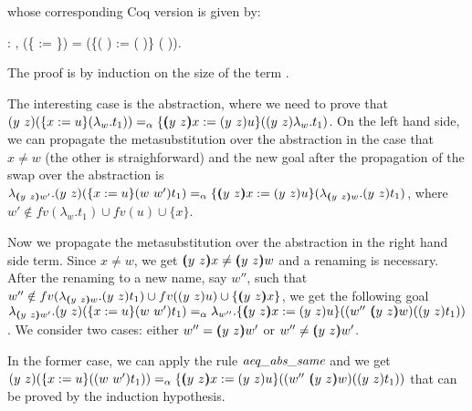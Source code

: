 \noindent whose corresponding Coq version is given by: \newline 
\begin{coqdoccode}
\coqdocnoindent
{} : \coqdockw{\ensuremath{\forall}}     ,    (\{ := \}) = (\{(   ) := (   )\} (   )).\coqdoceol
\end{coqdoccode}
 The proof is by induction on the size of the term .
\begin{coqdoccode}
\end{coqdoccode}
The interesting case is the abstraction, where we need to prove that $\swap{y}{z}{(\metasub{(\lambda_w.t_1)}{x}{u})} =_\alpha \metasub{(\swap{y}{z}{\lambda_w.t_1})}{\vswap{y}{z}{x}}{\swap{y}{z}{u}}$. On the left hand side, we can propagate the metasubstitution over the abstraction in the case that $x \neq w$ (the other is straighforward) and the new goal after the propagation of the swap over the abstraction is $\lambda_{\vswap{y}{z}{w'}}.\swap{y}{z}{(\metasub{\swap{w}{w'}{t_1}}{x}{u})} =_\alpha \metasub{(\lambda_{\vswap{y}{z}{w}}.\swap{y}{z}{t_1})}{\vswap{y}{z}{x}}{\swap{y}{z}{u}}$, where $w' \notin fv(\lambda_w.t_1) \cup fv(u) \cup \{x\}$.
\begin{coqdoccode}
\end{coqdoccode}
Now we propagate the metasubstitution over the abstraction in the right hand side term. Since $x\neq w$, we get $\vswap{y}{z}{x} \neq \vswap{y}{z}{w}$ and a renaming is necessary. After the renaming to a new name, say $w''$, such that $w'' \notin fv(\lambda_{\vswap{y}{z}{w}}.\swap{y}{z}{t_1}) \cup fv(\swap{y}{z}{u}) \cup \{\vswap{y}{z}{x}\}$, we get the following goal $\lambda_{\vswap{y}{z}{w'}}.\swap{y}{z}{(\metasub{\swap{w}{w'}{t_1}}{x}{u})} =_\alpha \lambda_{w''}.\metasub{(\swap{w''}{\vswap{y}{z}{w}}{(\swap{y}{z}{t_1})})}{\vswap{y}{z}{x}}{\swap{y}{z}{u}}$. We consider two cases: either $w'' = \vswap{y}{z}{w'}$ or $w'' \neq \vswap{y}{z}{w'}$.
\begin{coqdoccode}
\end{coqdoccode}
In the former case, we can apply the rule $\mbox{\it aeq}\_\mbox{\it abs}\_\mbox{\it same}$ and we get $\swap{y}{z}{(\metasub{(\swap{w}{w'}{t_1})}{x}{u})} =_\alpha \metasub{(\swap{w''}{\vswap{y}{z}{w}}{(\swap{y}{z}{t_1})})}{\vswap{y}{z}{x}}{\swap{y}{z}{u}}$ that can be proved by the induction hypothesis.
